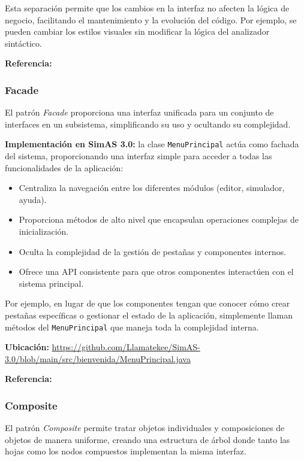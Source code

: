 Esta separación permite que los cambios en la interfaz no afecten la lógica de negocio, facilitando el mantenimiento y la evolución del código. Por ejemplo, se pueden cambiar los estilos visuales sin modificar la lógica del analizador sintáctico.

\textbf{Referencia:} \cite{krasner1988model}

\subsubsection{Facade}

El patrón \textit{Facade} proporciona una interfaz unificada para un conjunto de interfaces en un subsistema, simplificando su uso y ocultando su complejidad.

\textbf{Implementación en SimAS 3.0:} la clase \texttt{MenuPrincipal} actúa como fachada del sistema, proporcionando una interfaz simple para acceder a todas las funcionalidades de la aplicación:

\begin{itemize}
    \item Centraliza la navegación entre los diferentes módulos (editor, simulador, ayuda).
    \item Proporciona métodos de alto nivel que encapsulan operaciones complejas de inicialización.
    \item Oculta la complejidad de la gestión de pestañas y componentes internos.
    \item Ofrece una API consistente para que otros componentes interactúen con el sistema principal.
\end{itemize}

Por ejemplo, en lugar de que los componentes tengan que conocer cómo crear pestañas específicas o gestionar el estado de la aplicación, simplemente llaman métodos del \texttt{MenuPrincipal} que maneja toda la complejidad interna.

\textbf{Ubicación:} \url{https://github.com/Llamatekee/SimAS-3.0/blob/main/src/bienvenida/MenuPrincipal.java}

\textbf{Referencia:} \cite[pp. 185-193]{gamma1994design}

\subsubsection{Composite}

El patrón \textit{Composite} permite tratar objetos individuales y composiciones de objetos de manera uniforme, creando una estructura de árbol donde tanto las hojas como los nodos compuestos implementan la misma interfaz.

